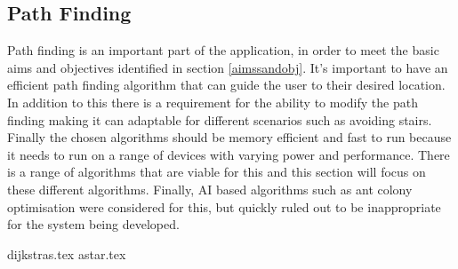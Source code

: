 \subsection{Path Finding}
Path finding is an important part of the application, in order to meet the basic aims and objectives identified in section \ref{aimssandobj}. It's important to have an efficient path finding algorithm that can guide the user to their desired location. In addition to this there is a requirement for the ability to modify the path finding making it can adaptable for different scenarios such as avoiding stairs. Finally the chosen algorithms should be memory efficient and fast to run because it needs to run on a range of devices with varying power and performance. There is a range of algorithms that are viable for this and this section will focus on these different algorithms. Finally, AI based algorithms such as ant colony optimisation were considered for this, but quickly ruled out to be inappropriate for the system being developed.

{dijkstras.tex}
{astar.tex}